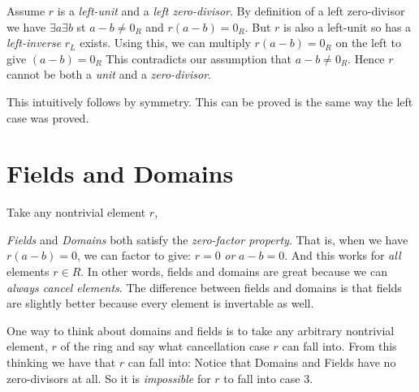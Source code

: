 \frmrule



Assume $r$ is a \textit{left-unit} and a \textit{left zero-divisor}.
By definition of a left zero-divisor we have $\exists a \exists b$ st $a-b \neq 0_R$ and $r(a-b) = 0_R$. 
But $r$ is also a left-unit so has a \textit{left-inverse} $r_L$ exists. 
Using this, we can multiply $r(a-b) = 0_R$ on the left to give $(a-b) = 0_R$
This contradicts our assumption that $a-b \neq 0_R$. 
Hence $r$ cannot be both a \textit{unit} and a \textit{zero-divisor}.


This intuitively follows by symmetry. This can be proved is the same way the left case was proved.









\section{Fields and Domains}

Take any nontrivial element $r$,

\textit{Fields} and \textit{Domains} both satisfy the \textit{zero-factor property}. 
That is, when we have $r(a-b) = 0$, we can factor to give: $r = 0$ \textit{or} $a - b = 0$. 
And this works for \textit{all} elements $r \in R$. In other words, 
fields and domains are great because we can \textit{always cancel elements}. 
The difference between fields and domains is that fields are slightly better because 
every element is invertable as well.

One way to think about domains and fields is to take any arbitrary nontrivial element, $r$ 
of the ring and say what cancellation case $r$ can fall into.  
From this thinking we have that $r$ can fall into:
Notice that Domains and Fields have no zero-divisors at all. 
So it is \textit{impossible} for $r$ to fall into case 3. 

